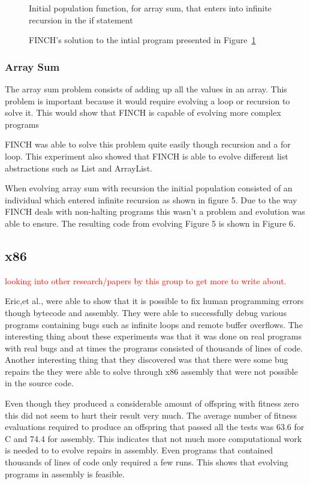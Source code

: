 \documentclass{sig-alternate}
\newcommand{\mycomment}[1]{\textcolor{red}{#1}}
\begin{document}
\begin{figure}
\centering
{}
\caption{Initial population function, for array sum, that enters into infinite recursion in the if statement}
\label{initial rec}
\end{figure}

\begin{figure}
\centering
{}
\caption{FINCH's solution to the intial program presented in Figure~\ref{initial rec}}
\end{figure}

\subsubsection{Array Sum}
The array sum problem consists of adding up all the values in an array. This problem is important because it would require evolving a loop or recursion to solve it. This would show that FINCH is capable of evolving more complex programs\par
FINCH was able to solve this problem quite easily though recursion and a for loop. This experiment also showed that FINCH is able to evolve different list abstractions such as List and ArrayList.

When evolving array sum with recursion the initial population consisted of an individual which entered infinite recursion as shown in figure 5. Due to the way FINCH deals with non-halting programs this wasn't a problem and evolution was able to ensure. The resulting code from evolving Figure 5 is shown in Figure 6.


\subsection{x86}
\mycomment{looking into other research/papers by this group to get more to write about.}

Eric,et al., were able to show that it is possible to fix human programming errors though bytecode and assembly. They were able to successfully debug various programs containing bugs such as infinite loops and remote buffer overflows. The interesting thing about these experiments was that it was done on real programs with real bugs and at times the programs consisted of thousands of lines of code. Another interesting thing that they discovered was that there were some bug repairs the they were able to solve through x86 assembly that were not possible in the source code. 

Even though they produced a considerable amount of offspring with fitness zero this did not seem to hurt their result very much. The average number of fitness evaluations required to produce an offspring that passed all the tests was 63.6 for C and 74.4 for assembly. This indicates that not much more computational work is needed to to evolve repairs in assembly. Even programs that contained thousands of lines of code only required a few runs. This shows that evolving programs in assembly is feasible.
\end{document}
